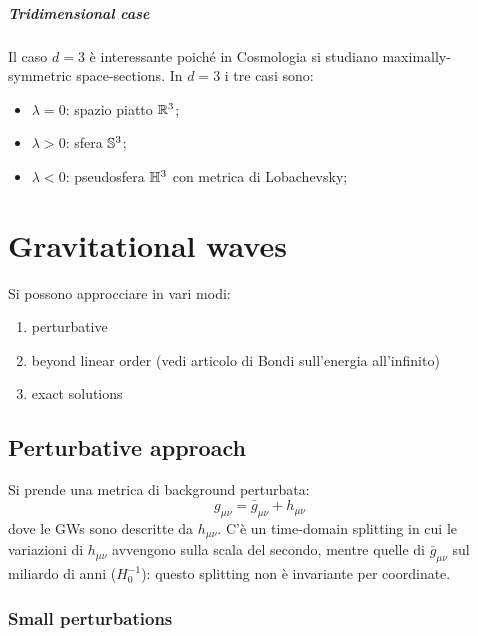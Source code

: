 \paragraph{Tridimensional case} Il caso $ d = 3 $ è interessante poiché in Cosmologia si studiano maximally-symmetric space-sections. In $ d = 3 $ i tre casi sono:
\begin{itemize}
  \item $ \lambda = 0 $: spazio piatto $ \mathbb{R}^3 $;
  \item $ \lambda > 0 $: sfera $ \mathbb{S}^{3} $;
  \item $ \lambda < 0 $: pseudosfera $ \mathbb{H}^{3} $ con metrica di Lobachevsky;
\end{itemize}


\chapter{Gravitational waves}

Si possono approcciare in vari modi:
\begin{enumerate}
  \item perturbative
  \item beyond linear order (vedi articolo di Bondi sull'energia all'infinito)
  \item exact solutions
\end{enumerate}

\section{Perturbative approach}

Si prende una metrica di background perturbata:
\begin{equation}
  g_{\mu \nu} = \bar{g}_{\mu \nu} + h_{\mu \nu}
\end{equation}
dove le GWs sono descritte da $ h_{\mu \nu} $. C'è un time-domain splitting in cui le variazioni di $ h_{\mu \nu} $ avvengono sulla scala del secondo, mentre quelle di $ \bar{g}_{\mu \nu} $ sul miliardo di anni ($ H_0^{-1} $): questo splitting non è invariante per coordinate.

\subsection{Small perturbations}

